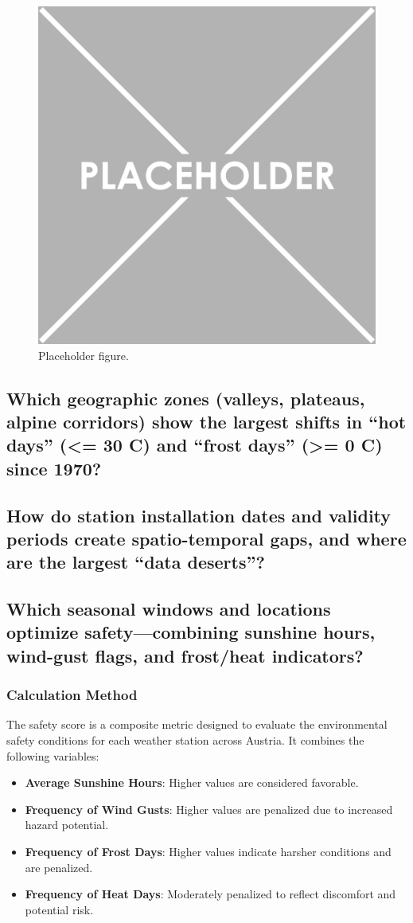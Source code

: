 \documentclass[sigconf]{acmart}
\begin{document}
\begin{figure}[H]
  \centering
  \includegraphics[width=0.4\linewidth]{img/placeholder.png}
  \caption{Placeholder figure.}
  \label{fig:placeholder}
\end{figure}


\subsection{Which geographic zones (valleys, plateaus, alpine corridors) show the largest shifts in “hot days” (<= 30 C) and “frost days” (>= 0 C) since 1970?}
\subsection{How do station installation dates and validity periods create spatio-temporal gaps, and where are the largest “data deserts”?}
\subsection{Which seasonal windows and locations optimize safety—combining sunshine hours, wind-gust flags, and frost/heat indicators?}

\subsubsection{Calculation Method}

The safety score is a composite metric designed to evaluate the environmental safety conditions for each weather station across Austria. It combines the following variables:

\begin{itemize}
    \item \textbf{Average Sunshine Hours}: Higher values are considered favorable.
    \item \textbf{Frequency of Wind Gusts}: Higher values are penalized due to increased hazard potential.
    \item \textbf{Frequency of Frost Days}: Higher values indicate harsher conditions and are penalized.
    \item \textbf{Frequency of Heat Days}: Moderately penalized to reflect discomfort and potential risk.
\end{itemize}
\end{document}
